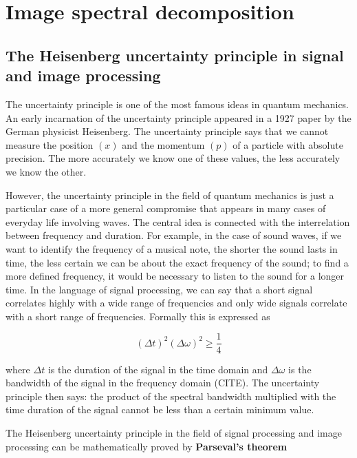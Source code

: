 
\chapter{Image spectral decomposition}



\section{The Heisenberg uncertainty principle in signal and image
processing}\label{the-heisenberg-uncertainty-principle-in-signal-and-image-processing}

The uncertainty principle is one of the most famous ideas in quantum mechanics. An early incarnation of the uncertainty principle appeared in a 1927 paper by the German physicist Heisenberg. The uncertainty principle says that we cannot measure the position $(x)$ and the momentum $(p)$ of a particle with absolute precision. The more accurately we know one of these values, the less accurately we know the other. 

However, the uncertainty principle in the field of quantum mechanics is just a particular case of a more general compromise that appears in many cases of everyday life involving waves. The central idea is connected with the interrelation between frequency and duration. For example, in the case of sound waves, if we want to identify the frequency of a musical note, the shorter the sound lasts in time, the less certain we can be about the exact frequency of the sound; to find a more defined frequency, it would be necessary to listen to the sound for a longer time. In the language of signal processing, we can say that a short signal correlates highly with a wide range of frequencies and only wide signals correlate with a short range of frequencies. Formally this is expressed as

\begin{equation}\label{eq:uncertainty_principle}
	(\Delta t)^2(\Delta \omega)^2 \geq \frac{1}{4}
\end{equation}

where $\Delta t$ is the duration of the signal in the time domain and $\Delta \omega$ is the bandwidth of the signal in the frequency domain (CITE). The uncertainty principle then says: the product of the spectral bandwidth multiplied with the time duration of the signal cannot be less than a certain minimum value.


The Heisenberg uncertainty principle in the field of signal processing and image processing can be mathematically proved by \textbf{Parseval's theorem}

